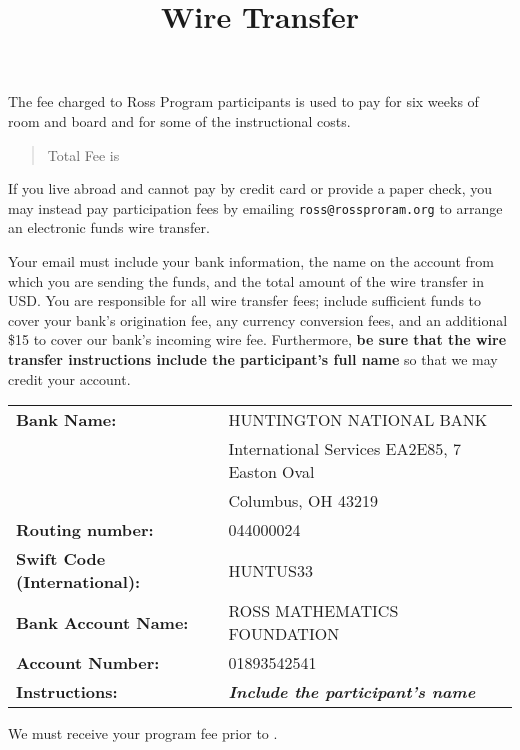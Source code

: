 \documentclass[11pt]{ross}
\title{Wire Transfer}
\begin{document}
\maketitle

The fee charged to Ross Program participants is used to pay for six
weeks of room and board and for some of the instructional costs.
\begin{quote}
Total Fee is \totalfee
\end{quote}

If you live abroad and cannot pay by credit card or provide a paper
check, you may instead pay participation fees by emailing
\texttt{ross@rossproram.org} to arrange an electronic funds wire
transfer.

Your email must include your bank information, the name on the account
from which you are sending the funds, and the total amount of the wire
transfer in USD.  You are responsible for all wire transfer fees;
include sufficient funds to cover your bank's origination fee, any
currency conversion fees, and an additional \$15 to cover our bank's
incoming wire fee.  Furthermore, \textbf{be sure that the wire
  transfer instructions include the participant's full name} so that
we may credit your account.

\begin{tabular}{ll}
  \textbf{Bank Name:} &  HUNTINGTON NATIONAL BANK \\
&  International Services EA2E85, 7 Easton Oval \\
&  Columbus, OH 43219   \\
\textbf{Routing number:} &  044000024 \\
\textbf{Swift Code (International):} & HUNTUS33 \\
\textbf{Bank Account Name:} & ROSS MATHEMATICS FOUNDATION \\
\textbf{Account Number:} &  01893542541 \\
  \textbf{Instructions:} &  \textit{\textbf{Include the participant's name}} \\
\end{tabular}

We must receive your program fee prior to \feeduedate.
\end{document}
